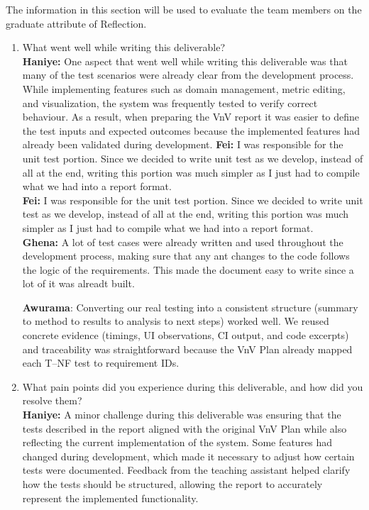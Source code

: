 \documentclass[12pt, titlepage]{article}
\begin{document}
The information in this section will be used to evaluate the team members on the
graduate attribute of Reflection.



\begin{enumerate}
  \item What went well while writing this deliverable?\\

  \textbf{Haniye:} One aspect that went well while writing this deliverable was that many of the test scenarios were already clear from the development process. While implementing features such as domain management, metric editing, and visualization, the system was frequently tested to verify correct behaviour. As a result, when preparing the VnV report it was easier to define the test inputs and expected outcomes because the implemented features had already been validated during development.    \textbf{Fei:} I was responsible for the unit test portion. Since we decided to write unit test as we develop, instead of all at the end, writing this portion was much simpler as I just had to compile what we had into a report format.\\

  \textbf{Fei:} I was responsible for the unit test portion. Since we decided to write unit test as we develop, instead of all at the end, writing this portion was much simpler as I just had to compile what we had into a report format.\\

  \textbf{Ghena:} A lot of test cases were already written and used throughout the development process, making sure that any ant changes to the code follows the logic of the requirements. This made the document easy to write since a lot of it was alreadt built.

  \textbf{Awurama}: Converting our real testing into a consistent structure (summary to method to results to analysis to next steps) worked well. We reused concrete evidence (timings, UI observations, CI output, and code excerpts) and traceability was straightforward because the VnV Plan already mapped each T--NF test to requirement IDs.

  \item What pain points did you experience during this deliverable, and how
    did you resolve them?\\

  \textbf{Haniye:} A minor challenge during this deliverable was ensuring that
    the tests described in the report aligned with the original VnV Plan while
    also reflecting the current implementation of the system. Some features had
    changed during development, which made it necessary to adjust how certain
    tests were documented. Feedback from the teaching assistant helped clarify
    how the tests should be structured, allowing the report to accurately
    represent the implemented functionality.


\end{enumerate}
\end{document}
